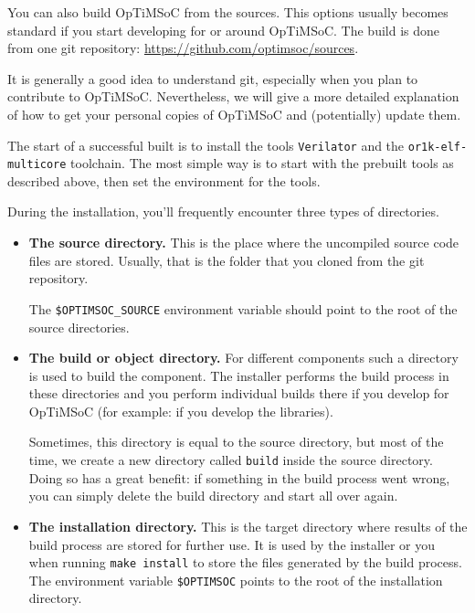 You can also build OpTiMSoC from the sources. This options usually
becomes standard if you start developing for or around OpTiMSoC. The
build is done from one git repository:
\url{https://github.com/optimsoc/sources}.

It is generally a good idea to understand git, especially when you
plan to contribute to OpTiMSoC. Nevertheless, we will give a more
detailed explanation of how to get your personal copies of OpTiMSoC
and (potentially) update them.

The start of a successful built is to install the tools
\verb|Verilator| and the \verb|or1k-elf-multicore| toolchain. The most
simple way is to start with the prebuilt tools as described above,
then set the environment for the tools.

\begin{docnote}
During the installation, you'll frequently encounter three types of
directories.

\begin{itemize}
 \item \textbf{The source directory.} This is the place where the
   uncompiled source code files are stored. Usually, that is the folder that
   you cloned from the git repository.

   The \verb|$OPTIMSOC_SOURCE| environment variable should point to
   the root of the source directories.
 \item \textbf{The build or object directory.} For different
   components such a directory is used to build the component. The
   installer performs the build process in these directories and you
   perform individual builds there if you develop for OpTiMSoC (for
   example: if you develop the libraries).

   Sometimes, this directory is equal to the source directory, but
   most of the time, we create a new directory called \texttt{build}
   inside the source directory. Doing so has a great benefit: if
   something in the build process went wrong, you can simply delete
   the build directory and start all over again.

 \item \textbf{The installation directory.} This is the target
   directory where results of the build process are stored for further
   use. It is used by the installer or you when running \texttt{make
     install} to store the files generated by the build process. The
   environment variable \verb|$OPTIMSOC| points to the root of the
   installation directory.
\end{itemize}

\end{docnote}

